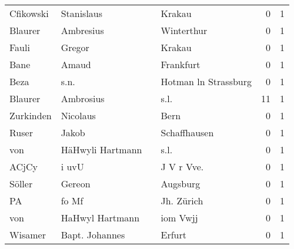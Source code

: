 \begin{center}
\begin{tiny}
\begin{longtabu}{llllrr}
                Cfikowski &                         Stanislaus &             &                                      Krakau &          0 &         1 \\
                  Blaurer &                          Ambresius &             &                                  Winterthur &          0 &         1 \\
                    Fauli &                             Gregor &             &                                      Krakau &          0 &         1 \\
                     Bane &                              Amaud &             &                                   Frankfurt &          0 &         1 \\
                     Beza &                               s.n. &             &                        Hotman ln Strassburg &          0 &         1 \\
                  Blaurer &                          Ambrosius &             &                                        s.l. &         11 &         1 \\
                Zurkinden &                           Nicolaus &             &                                        Bern &          0 &         1 \\
                    Ruser &                              Jakob &             &                                Schaffhausen &          0 &         1 \\
                      von &                   HäHwyli Hartmann &             &                                        s.l. &          0 &         1 \\
                    ACjCy &                              i uvU &             &                                 J V r Vve.  &          0 &         1 \\
                   Söller &                             Gereon &             &                                    Augsburg &          0 &         1 \\
                       PA &                              fo Mf &             &                                  Jh. Zürich &          0 &         1 \\
                      von &                    HaHwyl Hartmann &             &                                    iom Vwjj &          0 &         1 \\
                  Wisamer &                     Bapt. Johannes &             &                                      Erfurt &          0 &         1 \\

\end{longtabu}
\end{tiny}
\end{center}
